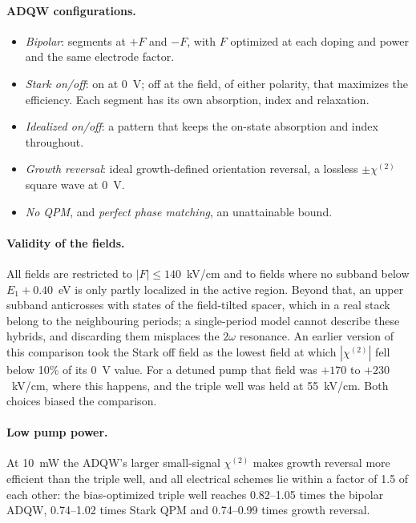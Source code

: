 \documentclass[11pt]{article}
\newcommand{\chitwo}{\chi^{(2)}}
\begin{document}
\paragraph{ADQW configurations.}
\begin{itemize}
\item \emph{Bipolar}: segments at $+F$ and $-F$, with $F$ optimized at each doping and power and the same electrode factor.
\item \emph{Stark on/off}: on at 0~V; off at the field, of either polarity, that maximizes the efficiency. Each segment has its own absorption, index and relaxation.
\item \emph{Idealized on/off}: a pattern that keeps the on-state absorption and index throughout.
\item \emph{Growth reversal}: ideal growth-defined orientation reversal, a lossless $\pm\chitwo$ square wave at 0~V.
\item \emph{No QPM}, and \emph{perfect phase matching}, an unattainable bound.
\end{itemize}

\paragraph{Validity of the fields.} All fields are restricted to $|F|\le140$~kV/cm and to fields where no subband below $E_1+0.40$~eV is only partly localized in the active region. Beyond that, an upper subband anticrosses with states of the field-tilted spacer, which in a real stack belong to the neighbouring periods; a single-period model cannot describe these hybrids, and discarding them misplaces the $2\omega$ resonance. An earlier version of this comparison took the Stark off field as the lowest field at which $|\chitwo|$ fell below 10\% of its 0~V value. For a detuned pump that field was $+170$ to $+230$~kV/cm, where this happens, and the triple well was held at 55~kV/cm. Both choices biased the comparison.

\paragraph{Low pump power.} At 10~mW the ADQW's larger small-signal $\chitwo$ makes growth reversal more efficient than the triple well, and all electrical schemes lie within a factor of 1.5 of each other: the bias-optimized triple well reaches 0.82--1.05 times the bipolar ADQW, 0.74--1.02 times Stark QPM and 0.74--0.99 times growth reversal.
\end{document}
